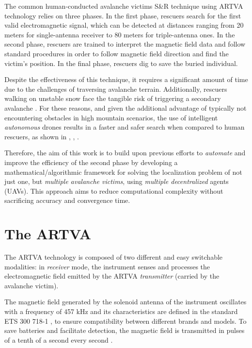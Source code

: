 The common human-conducted avalanche victims S\&R technique using ARTVA 
technology relies on three phases. In the first phase, rescuers search for the 
first valid electromagnetic signal, which can be detected at distances ranging 
from 20 meters for single-antenna receiver to 80 meters for triple-antenna ones. 
In the second phase, rescuers are trained to interpret the magnetic field data 
and follow standard procedures in order to follow magnetic field direction and 
find the victim's position. In the final phase, rescuers dig to save the buried 
individual.

Despite the effectiveness of this technique, it requires a significant amount of 
time due to the challenges of traversing avalanche terrain. Additionally, 
rescuers walking on unstable snow face the tangible risk of triggering a 
secondary avalanche \cite{first-model}. For these reasons, and given the 
additional advantage of typically not encountering obstacles in high mountain 
scenarios, the use of intelligent \textit{autonomous} drones results in a faster 
and safer search when compared to human rescuers, as shown in \cite{sr}, 
\cite{sr2}, \cite{sr3}.

Therefore, the aim of this work is to build upon previous efforts to 
\textit{automate} and improve the efficiency of the second phase by developing a 
mathematical/algorithmic framework for solving the localization problem of not 
just one, but \textit{multiple avalanche victims}, using \textit{multiple 
decentralized} agents (UAVs). This approach aims to reduce computational 
complexity without sacrificing accuracy and convergence time.

\section{The ARTVA}
The ARTVA technology is composed of two different and easy switchable modalities: 
in \textit{receiver} mode, the instrument senses and processes the 
electromagnetic field emitted by the ARTVA \textit{transmitter} (carried by the 
avalanche victim).

The magnetic field generated by the solenoid antenna of the instrument oscillates 
with a frequency of 457 kHz and its characteristics are defined in the standard 
ETS 300 718-1 \cite{eu_standard}, to ensure compatibility between different 
brands and models. To save batteries and facilitate detection, the magnetic field 
is transmitted in pulses of a tenth of a second every second \cite{first-model}.

